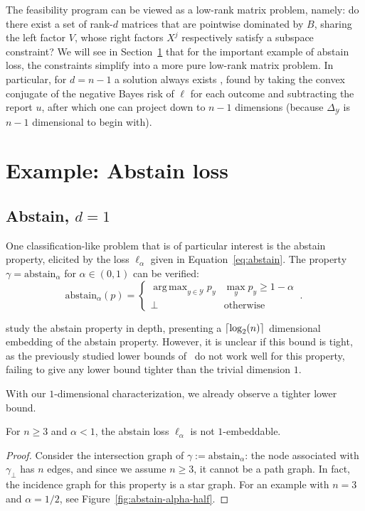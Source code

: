 \documentclass[anon]{colt2020} %
\newcommand{\abstain}[1]{\mathrm{abstain}_{#1}}
\newcommand{\simplex}{\Delta_\Y}
\newcommand{\Y}{\mathcal{Y}}
\newcommand{\ellabs}[1]{\ell_{#1}}
\DeclarePairedDelimiter\ceil{\lceil}{\rceil}
\DeclareMathOperator*{\argmax}{arg\,max}
\begin{document}
The feasibility program can be viewed as a low-rank matrix problem, namely: do there exist a set of rank-$d$ matrices that are pointwise dominated by $B$, sharing the left factor $V$, whose right factors $X^j$ respectively satisfy a subspace constraint?
We will see in Section~\ref{sec:examples} that for the important example of abstain loss, the constraints simplify into a more pure low-rank matrix problem.
In particular, for $d=n-1$ a solution always exists \cite[Theorem 2]{finocchiaro2019embedding}, found by taking the convex conjugate of the negative Bayes risk of $\ell$ for each outcome and subtracting the report $u$, after which one can project down to $n-1$ dimensions (because $\simplex$ is $n-1$ dimensional to begin with).




\section{Example: Abstain loss}\label{sec:examples}
\subsection{Abstain, $d=1$}\label{subsec:abstain-d1}
One classification-like problem that is of particular interest is the abstain property, elicited by the loss $\ellabs{\alpha}$ given in Equation~\eqref{eq:abstain}.
The property $\gamma = \abstain{\alpha}$ for $\alpha \in (0,1)$ can be verified:
\begin{equation}\label{eq:abstain-prop}
     \abstain{\alpha}(p) = \begin{cases}
     \argmax_{y \in \Y} p_y & \max_y p_y \geq 1 - \alpha\\
     \bot & \text{otherwise}
     \end{cases}~.~
\end{equation}

\cite{ramaswamy2018consistent} study the abstain property in depth, presenting a $\ceil {\log_2(n)}$ dimensional embedding of the abstain property.
However, it is unclear if this bound is tight, as the previously studied lower bounds of~\cite{ramaswamy2016convex} do not work well for this property, failing to give any lower bound tighter than the trivial dimension $1$.

With our $1$-dimensional characterization, we already observe a tighter lower bound.
\begin{proposition}
	For $n \geq 3$ and $\alpha < 1$, the abstain loss $\ell_{\alpha}$ is not $1$-embeddable.
\end{proposition}
\begin{proof}
	Consider the intersection graph of $\gamma := \abstain{\alpha}$: the node associated with $\gamma_\bot$ has $n$ edges, and since we assume $n \geq 3$, it cannot be a path graph.
	In fact, the incidence graph for this property is a star graph.
	For an example with $n=3$ and $\alpha = 1/2$, see Figure~\ref{fig:abstain-alpha-half}.
\end{proof}
\end{document}
